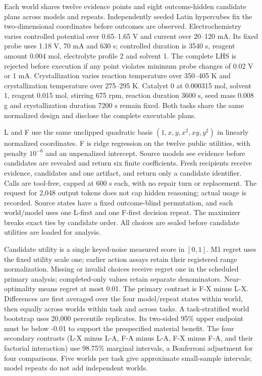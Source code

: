 \documentclass[10pt,twocolumn]{article}
\begin{document}
Each world shares twelve evidence points and eight outcome-hidden
candidate plans across models and repeats. Independently seeded Latin
hypercubes fix the two-dimensional coordinates before outcomes are
observed. Electrochemistry varies controlled potential over 0.65--1.65 V
and current over 20--120 mA. Its fixed probe uses 1.18 V, 70 mA and 630
s; controlled duration is 3540 s, reagent amount 0.004 mol, electrolyte
profile 2 and solvent 1. The complete LHS is rejected before execution
if any point violates minimum probe changes of 0.02 V or 1 mA.
Crystallization varies reaction temperature over 350--405 K and
crystallization temperature over 275--295 K. Catalyst 0 at 0.000315 mol,
solvent 1, reagent 0.015 mol, stirring 675 rpm, reaction duration 3600
s, seed mass 0.008 g and crystallization duration 7200 s remain fixed.
Both tasks share the same normalized design and disclose the complete
executable plans.

L and F use the same unclipped quadratic basis \((1,x,y,x^2,xy,y^2)\) in
linearly normalized coordinates. F is ridge regression on the twelve
public utilities, with penalty \(10^{-6}\) and an unpenalized intercept.
Source models see evidence before candidates are revealed and return six
finite coefficients. Fresh recipients receive evidence, candidates and
one artifact, and return only a candidate identifier. Calls are
tool-free, capped at 600 s each, with no repair turn or replacement. The
request for 2,048 output tokens does not cap hidden reasoning; actual
usage is recorded. Source states have a fixed outcome-blind permutation,
and each world/model uses one L-first and one F-first decision repeat.
The maximizer breaks exact ties by candidate order. All choices are
sealed before candidate utilities are loaded for analysis.

Candidate utility is a single keyed-noise measured score in \([0,1]\).
M1 regret uses the fixed utility scale one; earlier action assays retain
their registered range normalization. Missing or invalid choices receive
regret one in the scheduled primary analysis; completed-only values
retain separate denominators. Near-optimality means regret at most 0.01.
The primary contrast is F-X minus L-X. Differences are first averaged
over the four model/repeat states within world, then equally across
worlds within task and across tasks. A task-stratified world bootstrap
uses 20,000 percentile replicates. Its two-sided 95\% upper endpoint
must be below -0.01 to support the prespecified material benefit. The
four secondary contrasts (L-X minus L-A, F-A minus L-A, F-X minus F-A,
and their factorial interaction) use 98.75\% marginal intervals, a
Bonferroni adjustment for four comparisons. Five worlds per task give
approximate small-sample intervals; model repeats do not add independent
worlds.
\end{document}
